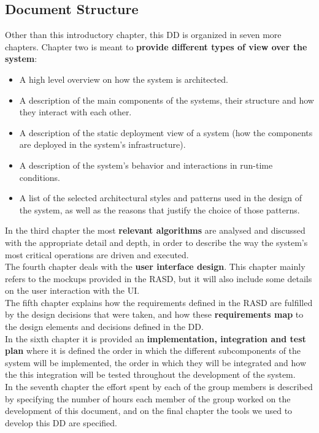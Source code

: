 \documentclass[12pt]{article}
\begin{document}
\subsection{Document Structure}
Other than this introductory chapter, this DD is organized in seven more chapters. Chapter two is meant to \textbf{provide different types of view over the system}:
\begin{itemize}
    \item A high level overview on how the system is architected.
    \item A description of the main components of the systems, their structure and how they interact with each other.
    \item A description of the static deployment view of a system (how the components are deployed in the system's infrastructure). 
    \item A description of the system's behavior and interactions in run-time conditions.
    \item A list of the selected architectural styles and patterns used in the design of the system, as well as the reasons that justify the choice of those patterns.
\end{itemize}
In the third chapter the most \textbf{relevant algorithms} are analysed and discussed with the appropriate detail and depth, in order to describe the way the system's most critical operations are driven and executed.\\
The fourth chapter deals with the \textbf{user interface design}. This chapter mainly refers to the mockups provided in the RASD, but it will also include some details on the user interaction with the UI.\\
The fifth chapter explains how the requirements defined in the RASD are fulfilled by the design decisions that were taken, and how these \textbf{requirements map} to the design elements and decisions defined in the DD.\\
In the sixth chapter it is provided an \textbf{implementation, integration and test plan} where it is defined the order in which the different subcomponents of the system will be implemented, the order in which they will be integrated and how the this integration will be tested throughout the development of the system.\\
In the seventh chapter the effort spent by each of the group members is described by specifying the number of hours each member of the group worked on the development of this document, and on the final chapter the tools we used to develop this DD are specified.
\end{document}
